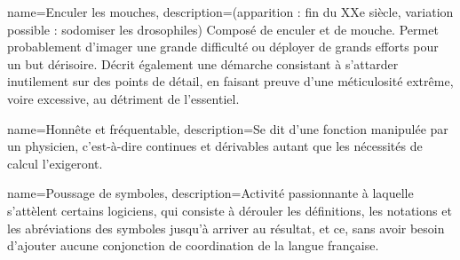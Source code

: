 {
	name=Enculer les mouches,
	description={(apparition : fin du XXe siècle, variation possible : sodomiser les drosophiles) Composé de enculer et de mouche. Permet probablement d'imager une grande difficulté ou déployer de grands efforts pour un but dérisoire. Décrit également une démarche consistant à s'attarder inutilement sur des points de détail, en faisant preuve d'une méticulosité extrême, voire excessive, au détriment de l'essentiel.}
}

{
	name=Honnête et fréquentable,
	description={Se dit d'une fonction manipulée par un physicien, c'est-à-dire continues et dérivables autant que les nécessités de calcul l'exigeront.}
}

{
	name=Poussage de symboles,
	description={Activité passionnante à laquelle s'attèlent certains logiciens, qui consiste à dérouler les définitions, les notations et les abréviations des symboles jusqu'à arriver au résultat, et ce, sans avoir besoin d'ajouter aucune conjonction de coordination de la langue française.}
}